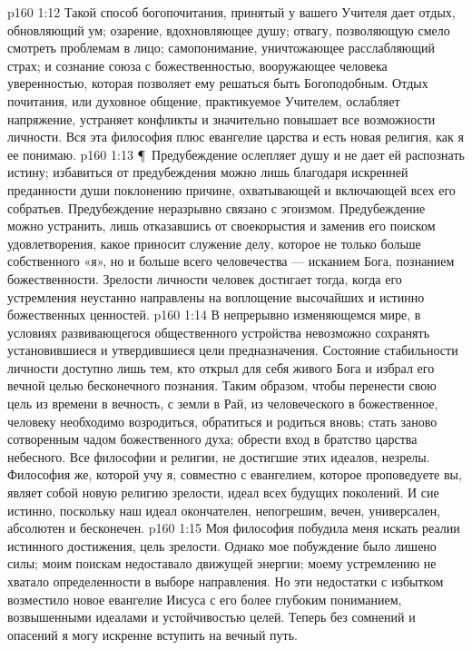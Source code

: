\vs p160 1:12 Такой способ богопочитания, принятый у вашего Учителя дает отдых, обновляющий ум; озарение, вдохновляющее душу; отвагу, позволяющую смело смотреть проблемам в лицо; самопонимание, уничтожающее расслабляющий страх; и сознание союза с божественностью, вооружающее человека уверенностью, которая позволяет ему решаться быть Богоподобным. Отдых почитания, или духовное общение, практикуемое Учителем, ослабляет напряжение, устраняет конфликты и значительно повышает все возможности личности. Вся эта философия плюс евангелие царства и есть новая религия, как я ее понимаю.
\vs p160 1:13 \P\ Предубеждение ослепляет душу и не дает ей распознать истину; избавиться от предубеждения можно лишь благодаря искренней преданности души поклонению причине, охватывающей и включающей всех его собратьев. Предубеждение неразрывно связано с эгоизмом. Предубеждение можно устранить, лишь отказавшись от своекорыстия и заменив его поиском удовлетворения, какое приносит служение делу, которое не только больше собственного «я», но и больше всего человечества --- исканием Бога, познанием божественности. Зрелости личности человек достигает тогда, когда его устремления неустанно направлены на воплощение высочайших и истинно божественных ценностей.
\vs p160 1:14 В непрерывно изменяющемся мире, в условиях развивающегося общественного устройства невозможно сохранять установившиеся и утвердившиеся цели предназначения. Состояние стабильности личности доступно лишь тем, кто открыл для себя живого Бога и избрал его вечной целью бесконечного познания. Таким образом, чтобы перенести свою цель из времени в вечность, с земли в Рай, из человеческого в божественное, человеку необходимо возродиться, обратиться и родиться вновь; стать заново сотворенным чадом божественного духа; обрести вход в братство царства небесного. Все философии и религии, не достигшие этих идеалов, незрелы. Философия же, которой учу я, совместно с евангелием, которое проповедуете вы, являет собой новую религию зрелости, идеал всех будущих поколений. И сие истинно, поскольку наш идеал окончателен, непогрешим, вечен, универсален, абсолютен и бесконечен.
\vs p160 1:15 Моя философия побудила меня искать реалии истинного достижения, цель зрелости. Однако мое побуждение было лишено силы; моим поискам недоставало движущей энергии; моему устремлению не хватало определенности в выборе направления. Но эти недостатки с избытком возместило новое евангелие Иисуса с его более глубоким пониманием, возвышенными идеалами и устойчивостью целей. Теперь без сомнений и опасений я могу искренне вступить на вечный путь.
